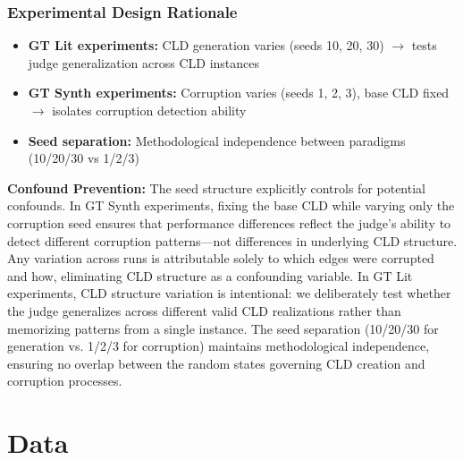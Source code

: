 \subsubsection{Experimental Design Rationale}
\begin{itemize}[noitemsep]
    \item \textbf{GT Lit experiments:} CLD generation varies (seeds 10, 20, 30) $\rightarrow$ tests judge generalization across CLD instances
    \item \textbf{GT Synth experiments:} Corruption varies (seeds 1, 2, 3), base CLD fixed $\rightarrow$ isolates corruption detection ability
    \item \textbf{Seed separation:} Methodological independence between paradigms (10/20/30 vs 1/2/3)
\end{itemize}

\textbf{Confound Prevention:} The seed structure explicitly controls for potential confounds. In GT Synth experiments, fixing the base CLD while varying only the corruption seed ensures that performance differences reflect the judge's ability to detect different corruption patterns---not differences in underlying CLD structure. Any variation across runs is attributable solely to which edges were corrupted and how, eliminating CLD structure as a confounding variable. In GT Lit experiments, CLD structure variation is intentional: we deliberately test whether the judge generalizes across different valid CLD realizations rather than memorizing patterns from a single instance. The seed separation (10/20/30 for generation vs. 1/2/3 for corruption) maintains methodological independence, ensuring no overlap between the random states governing CLD creation and corruption processes.

\section{Data}

